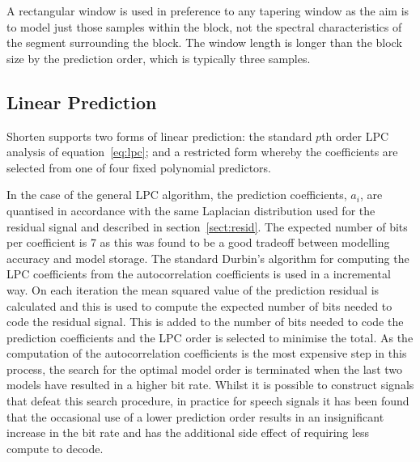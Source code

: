 A rectangular window is used in preference to any tapering window as the
aim is to model just those samples within the block, not the spectral
characteristics of the segment surrounding the block.  The window length
is longer than the block size by the prediction order, which is
typically three samples.

\subsection{Linear Prediction\label{sect:lpc}}

Shorten supports two forms of linear prediction: the standard $p$th
order LPC analysis of equation~\ref{eq:lpc}; and a restricted form
whereby the coefficients are selected from one of four fixed polynomial
predictors.

In the case of the general LPC algorithm, the prediction coefficients,
$a_i$, are quantised in accordance with the same Laplacian distribution
used for the residual signal and described in section~\ref{sect:resid}.
The expected number of bits per coefficient is 7 as this was found to be
a good tradeoff between modelling accuracy and model storage.  The
standard Durbin's algorithm for computing the LPC coefficients from the
autocorrelation coefficients is used in a incremental way.  On each
iteration the mean squared value of the prediction residual is
calculated and this is used to compute the expected number of bits
needed to code the residual signal.  This is added to the number of bits
needed to code the prediction coefficients and the LPC order is selected
to minimise the total.  As the computation of the autocorrelation
coefficients is the most expensive step in this process, the search for
the optimal model order is terminated when the last two models have
resulted in a higher bit rate.  Whilst it is possible to construct
signals that defeat this search procedure, in practice for speech
signals it has been found that the occasional use of a lower prediction
order results in an insignificant increase in the bit rate and has the
additional side effect of requiring less compute to decode.

